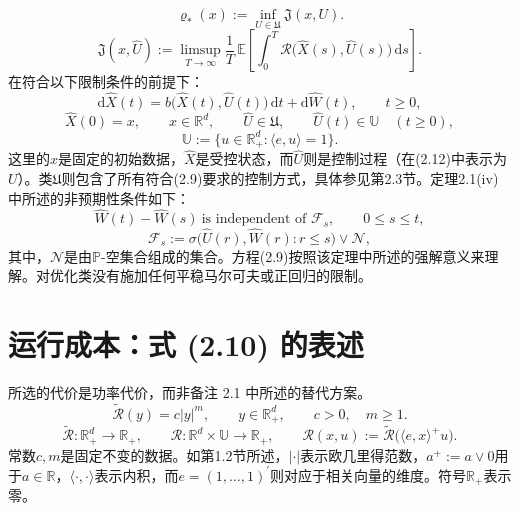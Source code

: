 \documentclass{article}
\begin{document}
\begin{equation}
\varrho_*(x):=\inf_{U\in\mathfrak U}\mathfrak J(x,U).
\tag{2.12}
\end{equation}
\[
\mathfrak J(x,\hat U):=\limsup_{T\to\infty}\frac1T\,\mathbb E\left[\int_0^T\mathcal R\bigl(\hat X(s),\hat U(s)\bigr)\,\mathrm ds\right].
\]
在符合以下限制条件的前提下：
\begin{equation}
\mathrm d\hat X(t)=b\bigl(\hat X(t),\hat U(t)\bigr)\,\mathrm dt+\mathrm d\hat W(t),\qquad t\geq0,
\tag{2.9}
\end{equation}
\[
\hat X(0)=x,\qquad x\in\mathbb R^d,
\qquad \hat U\in\mathfrak U,\qquad \hat U(t)\in\mathbb U\quad(t\geq0),
\]
\[
\mathbb U:=\{u\in\mathbb R_+^d:\langle e,u\rangle=1\}.
\]
这里的\(x\)是固定的初始数据，\(\hat X\)是受控状态，而\(\hat U\)则是控制过程（在(2.12)中表示为\(U\)）。类\(\mathfrak U\)则包含了所有符合(2.9)要求的控制方式，具体参见第2.3节。定理2.1(iv)中所述的非预期性条件如下：
\[
\hat W(t)-\hat W(s)\ \text{is independent of }\mathcal F_s,
\qquad 0\leq s\leq t,
\]
\[
\mathcal F_s:=\sigma\bigl(\hat U(r),\hat W(r):r\leq s\bigr)\vee\mathcal N,
\]
其中，\(\mathcal N\)是由\(\mathbb P\)-空集合组成的集合。方程(2.9)按照该定理中所述的强解意义来理解。对优化类没有施加任何平稳马尔可夫或正回归的限制。

\section*{运行成本：式 (2.10) 的表述}
所选的代价是功率代价，而非备注 2.1 中所述的替代方案。
\begin{equation}
\widetilde{\mathcal R}(y)=c|y|^m,\qquad y\in\mathbb R_+^d,
\qquad c>0,\quad m\geq1.
\tag{2.10}
\end{equation}
\[
\widetilde{\mathcal R}:\mathbb R_+^d\longrightarrow\mathbb R_+,
\qquad
\mathcal R:\mathbb R^d\times\mathbb U\longrightarrow\mathbb R_+,
\qquad
\mathcal R(x,u):=\widetilde{\mathcal R}\bigl(\langle e,x\rangle^+u\bigr).
\]
常数\(c,m\)是固定不变的数据。如第1.2节所述，\(|\cdot|\)表示欧几里得范数，\(a^+:=a\vee0\)用于\(a\in\mathbb R\)，\(\langle\cdot,\cdot\rangle\)表示内积，而\(e=(1,\ldots,1)^\prime\)则对应于相关向量的维度。符号\(\mathbb R_+\)表示零。
\end{document}
